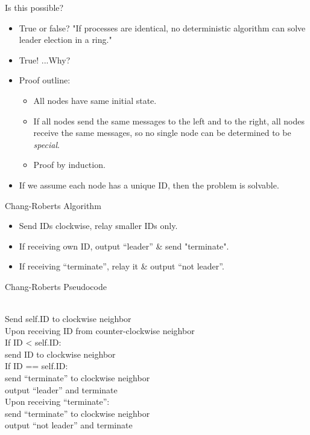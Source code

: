 \documentclass[aspectratio=169]{beamer}
\begin{document}
\begin{frame}{Is this possible?}
    \begin{itemize}
        \item True or false? "If processes are identical, no deterministic algorithm can solve leader election in a ring." \pause
        \item True! ...Why? \pause
        \item Proof outline:
        \begin{itemize}
            \item All nodes have same initial state.
            \item If all nodes send the same messages to the left and to the right, all nodes receive the same messages, so no single node can be determined to be \emph{special}.
            \item Proof by induction.
        \end{itemize}\pause
        \item If we assume each node has a unique ID, then the problem is solvable.
    \end{itemize}
\end{frame}


\begin{frame}{Chang-Roberts Algorithm}
    \begin{itemize}
        \item Send IDs clockwise, relay smaller IDs only.
        \item If receiving own ID, output “leader” \& send "terminate".
        \item If receiving “terminate”, relay it \& output “not leader”.
    \end{itemize}
\end{frame}

\begin{frame}{Chang-Roberts Pseudocode}
    \begin{algo}
        \+
        \\  Send self.ID to clockwise neighbor
        \\  Upon receiving ID from counter-clockwise neighbor\+
        \\      If ID < self.ID:\+
        \\          send ID to clockwise neighbor\-
        \\      If ID == self.ID:\+
        \\          send “terminate” to clockwise neighbor
        \\          output “leader” and terminate\-\-
        \\  Upon receiving “terminate”:\+
        \\      send “terminate” to clockwise neighbor
        \\      output “not leader” and terminate
    \end{algo}
\end{frame}
\end{document}
